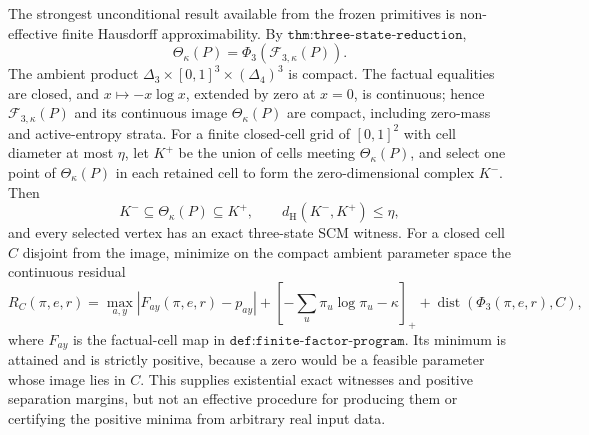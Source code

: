 The strongest unconditional result available from the frozen primitives is non-effective finite Hausdorff approximability.  By \(\texttt{thm:three-state-reduction}\),
\[
\Theta_\kappa(P)=\Phi_3(\mathcal F_{3,\kappa}(P)).
\]
The ambient product \(\Delta_3\times[0,1]^3\times(\Delta_4)^3\) is compact.  The factual equalities are closed, and \(x\mapsto-x\log x\), extended by zero at \(x=0\), is continuous; hence \(\mathcal F_{3,\kappa}(P)\) and its continuous image \(\Theta_\kappa(P)\) are compact, including zero-mass and active-entropy strata.  For a finite closed-cell grid of \([0,1]^2\) with cell diameter at most \(\eta\), let \(K^+\) be the union of cells meeting \(\Theta_\kappa(P)\), and select one point of \(\Theta_\kappa(P)\) in each retained cell to form the zero-dimensional complex \(K^-\).  Then
\[
K^-\subseteq\Theta_\kappa(P)\subseteq K^+,
\qquad d_{\mathrm H}(K^-,K^+)\leq\eta,
\]
and every selected vertex has an exact three-state SCM witness.  For a closed cell \(C\) disjoint from the image, minimize on the compact ambient parameter space the continuous residual
\[
R_C(\pi,e,r)=
\max_{a,y}|F_{ay}(\pi,e,r)-p_{ay}|
+\left[-\sum_u\pi_u\log\pi_u-\kappa\right]_+
+\operatorname{dist}(\Phi_3(\pi,e,r),C),
\]
where \(F_{ay}\) is the factual-cell map in \(\texttt{def:finite-factor-program}\).  Its minimum is attained and is strictly positive, because a zero would be a feasible parameter whose image lies in \(C\).  This supplies existential exact witnesses and positive separation margins, but not an effective procedure for producing them or certifying the positive minima from arbitrary real input data.